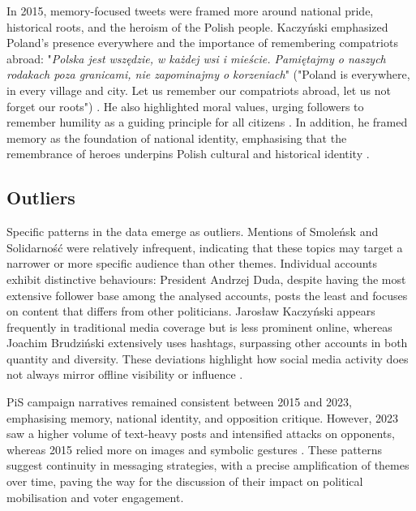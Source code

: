 In 2015, memory-focused tweets were framed more around national pride, historical roots, and the heroism of the Polish people. Kaczyński emphasized Poland’s presence everywhere and the importance of remembering compatriots abroad: "\textit{Polska jest wszędzie, w każdej wsi i mieście. Pamiętajmy o naszych rodakach poza granicami, nie zapominajmy o korzeniach}" ("Poland is everywhere, in every village and city. Let us remember our compatriots abroad, let us not forget our roots") \citep{pisorgpl2015e}. He also highlighted moral values, urging followers to remember humility as a guiding principle for all citizens \citep{pisorgpl2015f}. In addition, he framed memory as the foundation of national identity, emphasising that the remembrance of heroes underpins Polish cultural and historical identity \citep{pisorgpl2015g}.

\pagebreak

\subsection{Outliers}

Specific patterns in the data emerge as outliers. Mentions of Smoleńsk and Solidarność were relatively infrequent, indicating that these topics may target a narrower or more specific audience than other themes. Individual accounts exhibit distinctive behaviours: President Andrzej Duda, despite having the most extensive follower base among the analysed accounts, posts the least and focuses on content that differs from other politicians. Jarosław Kaczyński appears frequently in traditional media coverage but is less prominent online, whereas Joachim Brudziński extensively uses hashtags, surpassing other accounts in both quantity and diversity. These deviations highlight how social media activity does not always mirror offline visibility or influence \citep{rybicki_2025_16933320}. 

PiS campaign narratives remained consistent between 2015 and 2023, emphasising memory, national identity, and opposition critique. However, 2023 saw a higher volume of text-heavy posts and intensified attacks on opponents, whereas 2015 relied more on images and symbolic gestures \citep{rybicki_2025_16933320}. These patterns suggest continuity in messaging strategies, with a precise amplification of themes over time, paving the way for the discussion of their impact on political mobilisation and voter engagement.

